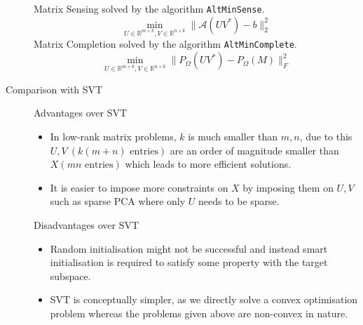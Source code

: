 \documentclass[a4paper]{article}
\begin{document}
\begin{description}
	Matrix Sensing solved by the algorithm \verb!AltMinSense!.
	\begin{equation}
	\min_{U \in \mathbb{R}^{m\times k}, V \in \mathbb{R}^{n\times k}} \|\mathcal{A}(UV^*)-b\|_2^2
	\end{equation}
	Matrix Completion solved by the algorithm \verb!AltMinComplete!.
	\begin{equation}
	\min_{U \in \mathbb{R}^{m\times k}, V \in \mathbb{R}^{n\times k}} \|P_{\Omega}(UV^*)-P_{\Omega}(M)\|_F^2
	\end{equation}
	\item[Comparison with SVT]\phantom{just a hack}

	Advantages over SVT
	\begin{itemize}
	\item In low-rank matrix problems, $k$ is much smaller than $m,n$, due to this $U, V\ (k(m+n) \text{ entries})$  are an order of magnitude smaller than $X (mn \text{ entries})$ which leads to more efficient solutions.
	\item It is easier to impose more constraints on $X$ by imposing them on $U, V$ such as sparse PCA where only $U$ needs to be sparse.
	\end{itemize}
	Disadvantages over SVT
	\begin{itemize}
	\item Random initialisation might not be successful and instead smart initialisation is required to satisfy some property with the target subspace.
	\item SVT is conceptually simpler, as we directly solve a convex optimisation problem whereas the problems given above are non-convex in nature.
	\end{itemize}
\end{description}
\end{document}
